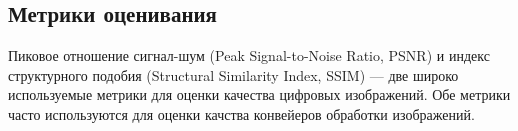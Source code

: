 \subsection{Метрики оценивания}\label{sect-4-3}

Пиковое отношение сигнал-шум (Peak Signal-to-Noise Ratio, PSNR) и индекс структурного подобия (Structural Similarity Index, SSIM) — две широко используемые метрики для оценки качества цифровых изображений. Обе метрики часто используются для оценки качства конвейеров обработки изображений.

